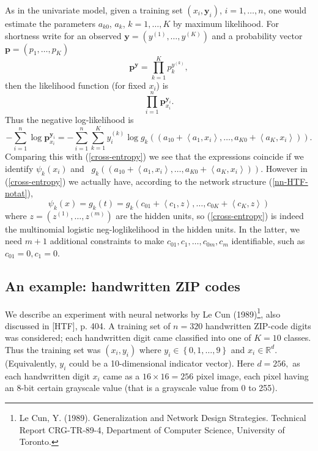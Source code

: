 \documentclass[11pt,twoside]{article}%
\theoremstyle{change}
\begin{document}
As in the univariate model, given a training set $\left(  x_{i},\mathbf{y}%
_{i}\right)  $, $i=1,\ldots,n$, one would estimate the parameters $a_{k0}$,
$a_{k}$, $k=1,\ldots,K$ by maximum likelihood. For shortness write for an
observed $\mathbf{y}=\left(  y^{(1)},\ldots,y^{(K)}\right)  $ and a
probability vector $\mathbf{p=}\left(  p_{1},\ldots,p_{K}\right)  $%
\[
\mathbf{p}^{\mathbf{y}}=%
{\displaystyle\prod\limits_{k=1}^{K}}
p_{k}^{y^{(k)}},
\]
then the likelihood function (for fixed $x_{i}$) is
\[%
{\displaystyle\prod\limits_{i=1}^{n}}
\mathbf{p}_{x_{i}}^{\mathbf{y}_{i}}.
\]
Thus the negative log-likelihood is
\[
-\sum_{i=1}^{n}\log\mathbf{p}_{x_{i}}^{\mathbf{y}_{i}}=-\sum_{i=1}^{n}%
\sum_{k=1}^{K}y_{i}^{(k)}\log g_{k}\left(  (a_{10}+\left\langle a_{1}%
,x_{i}\right\rangle ,\ldots,a_{K0}+\left\langle a_{K},x_{i}\right\rangle
)\right)  .
\]
Comparing this with (\ref{cross-entropy}) we see that the expressions coincide
if we identify $\psi_{k}(x_{i})$ and \linebreak\ $g_{k}\left(  (a_{10}%
+\left\langle a_{1},x_{i}\right\rangle ,\ldots,a_{K0}+\left\langle a_{K}%
,x_{i}\right\rangle )\right)  $. However in (\ref{cross-entropy}) we actually
have, according to the network structure (\ref{nn-HTF-notat}),
\begin{equation}
\psi_{k}(x)=g_{k}(t)=g_{k}(c_{01}+\left\langle c_{1},z\right\rangle
,\ldots,c_{0K}+\left\langle c_{K},z\right\rangle )\label{mult-logistic-reg-3}%
\end{equation}
where $z=(z^{(1)},\ldots,z^{(m)})$ are the hidden units, so
(\ref{cross-entropy}) is indeed the multinomial logistic neg-loglikelihood in
the hidden units. In the latter, we need $m+1$ additional constraints to make
$c_{01},c_{1},\ldots,c_{0m},c_{m}$ identifiable, such as $c_{01}=0,c_{1}=0$.

\subsection{An example: handwritten ZIP codes}

We describe an experiment with neural networks by Le Cun (1989)\footnote{Le
Cun, Y. (1989). Generalization and Network Design Strategies. Technical Report
CRG-TR-89-4, Department of Computer Science, University of Toronto.}, also
discussed in [HTF], p. 404. A training set of $n=320$ handwritten ZIP-code
digits was considered; each handwritten digit came classified into one of
$K=10$ classes. Thus the training set was $(x_{i},y_{i})$ where $y_{i}%
\in\left\{  0,1,\ldots,9\right\}  $ and $x_{i}\in\mathbb{R}^{d}$.
(Equivalently, $y_{i}$ could be a 10-dimensional indicator vector). Here
$d=256,$ as each handwritten digit $x_{i}$ came as a $16\times16=256$ pixel
image, each pixel having an $8$-bit certain grayscale value (that is a
grayscale value from 0 to 255).
\end{document}
